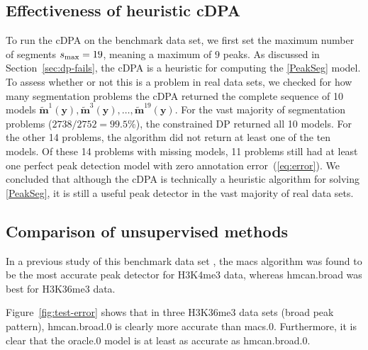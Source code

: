 \documentclass{article}
\begin{document}
\subsection{Effectiveness of heuristic cDPA}
\label{sec:heuristic-effectiveness}

To run the cDPA on the benchmark data set, we first set the maximum
number of segments $s_{\text{\text{max}}}=19$, meaning a maximum of $9$
peaks. 
As discussed in Section~\ref{sec:dp-fails}, the cDPA is a heuristic
for computing the \ref{PeakSeg} model. To assess whether or not this
is a problem in real data sets, we checked for how many segmentation
problems the cDPA returned the complete sequence of 10 models
$\mathbf{\tilde m}^1(\mathbf y),\mathbf{\tilde m}^3(\mathbf y), \dots,
\mathbf{\tilde m}^{19}(\mathbf y)$. For the vast majority of
segmentation problems ($2738/2752=99.5\%$), the constrained DP returned
all 10 models. For the other 14 problems, the algorithm did not return
at least one of the ten models. Of these 14 problems with missing
models, 11 problems still had at least one perfect peak detection
model with zero annotation error~(\ref{eq:error}). We concluded that
although the cDPA is technically a heuristic algorithm for
solving \ref{PeakSeg}, it is still a useful peak detector in the vast
majority of real data sets.



\subsection{Comparison of unsupervised methods}

In a previous study of this benchmark data set
\citep{hocking2014visual}, the macs algorithm was found to be the most
accurate peak detector for H3K4me3 data, whereas hmcan.broad was best
for H3K36me3 data.

Figure~\ref{fig:test-error} shows that in three H3K36me3 data sets
(broad peak pattern), hmcan.broad.0 is clearly more accurate than
macs.0. Furthermore, it is clear that the oracle.0 model is at least
as accurate as hmcan.broad.0.
\end{document}
